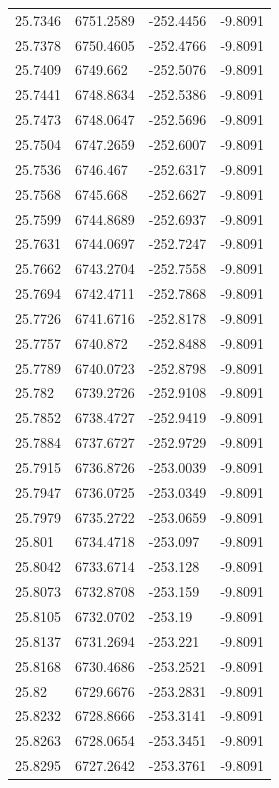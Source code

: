 \begin{table}[H]
\begin{tabular}{llll}
25.7346 & 6751.2589 & -252.4456 & -9.8091 \\
25.7378 & 6750.4605 & -252.4766 & -9.8091 \\
25.7409 & 6749.662 & -252.5076 & -9.8091 \\
25.7441 & 6748.8634 & -252.5386 & -9.8091 \\
25.7473 & 6748.0647 & -252.5696 & -9.8091 \\
25.7504 & 6747.2659 & -252.6007 & -9.8091 \\
25.7536 & 6746.467 & -252.6317 & -9.8091 \\
25.7568 & 6745.668 & -252.6627 & -9.8091 \\
25.7599 & 6744.8689 & -252.6937 & -9.8091 \\
25.7631 & 6744.0697 & -252.7247 & -9.8091 \\
25.7662 & 6743.2704 & -252.7558 & -9.8091 \\
25.7694 & 6742.4711 & -252.7868 & -9.8091 \\
25.7726 & 6741.6716 & -252.8178 & -9.8091 \\
25.7757 & 6740.872 & -252.8488 & -9.8091 \\
25.7789 & 6740.0723 & -252.8798 & -9.8091 \\
25.782 & 6739.2726 & -252.9108 & -9.8091 \\
25.7852 & 6738.4727 & -252.9419 & -9.8091 \\
25.7884 & 6737.6727 & -252.9729 & -9.8091 \\
25.7915 & 6736.8726 & -253.0039 & -9.8091 \\
25.7947 & 6736.0725 & -253.0349 & -9.8091 \\
25.7979 & 6735.2722 & -253.0659 & -9.8091 \\
25.801 & 6734.4718 & -253.097 & -9.8091 \\
25.8042 & 6733.6714 & -253.128 & -9.8091 \\
25.8073 & 6732.8708 & -253.159 & -9.8091 \\
25.8105 & 6732.0702 & -253.19 & -9.8091 \\
25.8137 & 6731.2694 & -253.221 & -9.8091 \\
25.8168 & 6730.4686 & -253.2521 & -9.8091 \\
25.82 & 6729.6676 & -253.2831 & -9.8091 \\
25.8232 & 6728.8666 & -253.3141 & -9.8091 \\
25.8263 & 6728.0654 & -253.3451 & -9.8091 \\
25.8295 & 6727.2642 & -253.3761 & -9.8091 \\

\end{tabular}
\end{table}
